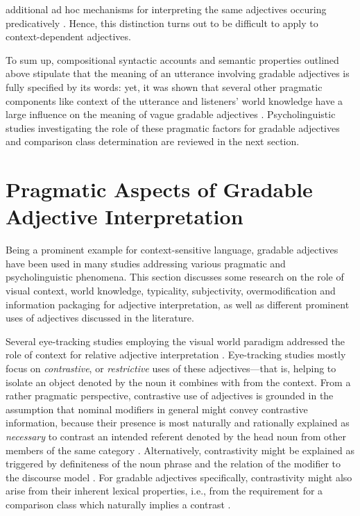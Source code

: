 additional ad hoc mechanisms for interpreting the same adjectives occuring predicatively \parencite[cf.][]{hofherr2010adjectives}. Hence, this distinction turns out to be difficult to apply to context-dependent adjectives. 

To sum up, compositional syntactic accounts and semantic properties outlined above stipulate that the meaning of an utterance involving gradable adjectives is fully specified by its words: yet, it was shown that several other pragmatic components like context of the utterance and listeners’ world knowledge have a large influence on the meaning of vague gradable adjectives \parencite[e.g.,][]{tessler2017warm, Kennedy2007, sedivy1999}. Psycholinguistic studies investigating the role of these pragmatic factors for gradable adjectives and comparison class determination are reviewed in the next section. 

\section{Pragmatic Aspects of Gradable Adjective Interpretation}
\label{2.4.}
Being a prominent example for context-sensitive language, gradable adjectives have been used in many studies addressing various pragmatic and psycholinguistic phenomena. This section discusses some research on the role of visual context, world knowledge, typicality, subjectivity, overmodification and information packaging for adjective interpretation, as well as different prominent uses of adjectives discussed in the literature. %

Several eye-tracking studies employing the  visual world paradigm addressed the role of context for relative adjective interpretation \parencite[e.g.,][]{sedivy1999, Aparicio2016}.
Eye-tracking studies mostly focus on \textit{contrastive}, or \textit{restrictive} uses of these adjectives---that is, helping to isolate an object denoted by the noun it combines with from the context. From a rather pragmatic perspective, contrastive use of adjectives is grounded in the assumption that nominal modifiers in general might convey contrastive information, because their presence is most naturally and rationally explained as \emph{necessary} to contrast an intended referent denoted by the head noun from other members of the same category \parencite{sedivy1999, clifton1989ambiguity}. Alternatively, contrastivity might be explained as triggered by definiteness of the noun phrase and the relation of the modifier to the discourse model \parencite{sedivy1999, steedman1989ambiguity}. For gradable adjectives specifically, contrastivity might also arise from their inherent lexical properties, i.e., from the requirement for a comparison class which naturally implies a contrast \parencite{Bierwisch1989, sedivy1999}. 


